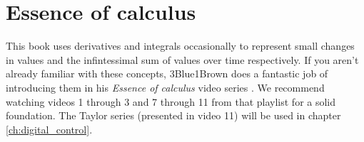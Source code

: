 \section{Essence of calculus}

This book uses derivatives and integrals occasionally to represent small changes
in values and the infintessimal sum of values over time respectively. If you
aren't already familiar with these concepts, 3Blue1Brown does a fantastic job of
introducing them in his \textit{Essence of calculus} video series
\cite{bib:essence_of_calculus}. We recommend watching videos 1 through 3 and 7
through 11 from that playlist for a solid foundation. The Taylor series
(presented in video 11) will be used in chapter \ref{ch:digital_control}.
